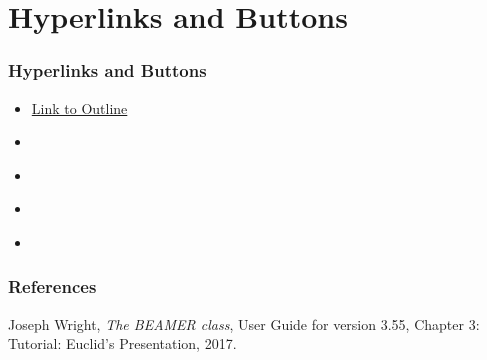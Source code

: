 \documentclass{beamer}
\begin{document}
\section{Hyperlinks and Buttons}
\begin{frame}
  \frametitle{Hyperlinks and Buttons}
  \begin{itemize}
  \item \hyperlink{outline}{Link to Outline}
  \item \hyperlink{outline}{}
  \item \hyperlink{outline}{}
  \item \hyperlink{outline}{}
  \item \hyperlink{outline}{}
  \end{itemize}
\end{frame}

\begin{frame}
  \frametitle{References}

  \begin{thebibliography}{9}
    Joseph Wright,
    \textit{The BEAMER class}, User Guide for version 3.55,
    Chapter 3: Tutorial: Euclid's Presentation,
    2017.
  \end{thebibliography}
\end{frame}
\end{document}
